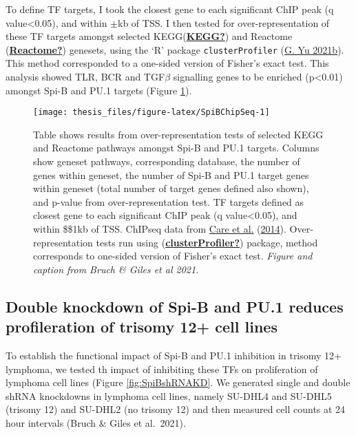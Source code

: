 \documentclass[11pt, a4paper, twosided]{book}
\begin{document}
To define TF targets, I took the closest gene to each significant ChIP peak (q value\textless0.05), and within \(\pm\)kb of TSS. I then tested for over-representation of these TF targets amongst selected KEGG(\protect\hyperlink{ref-KEGG}{\textbf{KEGG?}}) and Reactome (\protect\hyperlink{ref-Reactome}{\textbf{Reactome?}}) genesets, using the `R' package \texttt{clusterProfiler} (\protect\hyperlink{ref-R-clusterProfiler}{G. Yu 2021b}). This method corresponded to a one-sided version of Fisher's exact test. This analysis showed TLR, BCR and TGF\(\beta\) signalling genes to be enriched (p\textless0.01) amongst Spi-B and PU.1 targets (Figure \ref{fig:SpiBChipSeq}).


\begin{figure}

{\centering \texttt{[image: thesis\_files/figure-latex/SpiBChipSeq-1]} 

}

\caption{Table shows results from over-representation tests of selected KEGG and Reactome pathways amongst Spi-B and PU.1 targets. Columns show geneset pathways, corresponding database, the number of genes within geneset, the number of Spi-B and PU.1 target genes within geneset (total number of target genes defined also shown), and p-value from over-representation test. TF targets defined as closest gene to each significant ChIP peak (q value\textless0.05), and within \$\pm\$1kb of TSS. ChIPseq data from \protect\hyperlink{ref-Care2014}{Care et al.} (\protect\hyperlink{ref-Care2014}{2014}). Over-representation tests run using (\protect\hyperlink{ref-clusterProfiler}{\textbf{clusterProfiler?}}) package, method corresponds to one-sided version of Fisher's exact test. \emph{Figure and caption from Bruch \& Giles et al 2021.}}\label{fig:SpiBChipSeq}
\end{figure}
\hypertarget{double-knockdown-of-spi-b-and-pu.1-reduces-profileration-of-trisomy-12-cell-lines}{%
\subsection{Double knockdown of Spi-B and PU.1 reduces profileration of trisomy 12+ cell lines}\label{double-knockdown-of-spi-b-and-pu.1-reduces-profileration-of-trisomy-12-cell-lines}}

To establish the functional impact of Spi-B and PU.1 inhibition in trisomy 12+ lymphoma, we tested th impact of inhibiting these TFs on proliferation of lymphoma cell lines (Figure \ref{fig:SpiBshRNAKD}. We generated single and double shRNA knockdowns in lymphoma cell lines, namely SU-DHL4 and SU-DHL5 (trisomy 12) and SU-DHL2 (no trisomy 12) and then measured cell counts at 24 hour intervals (Bruch \& Giles et al.~2021).
\end{document}
